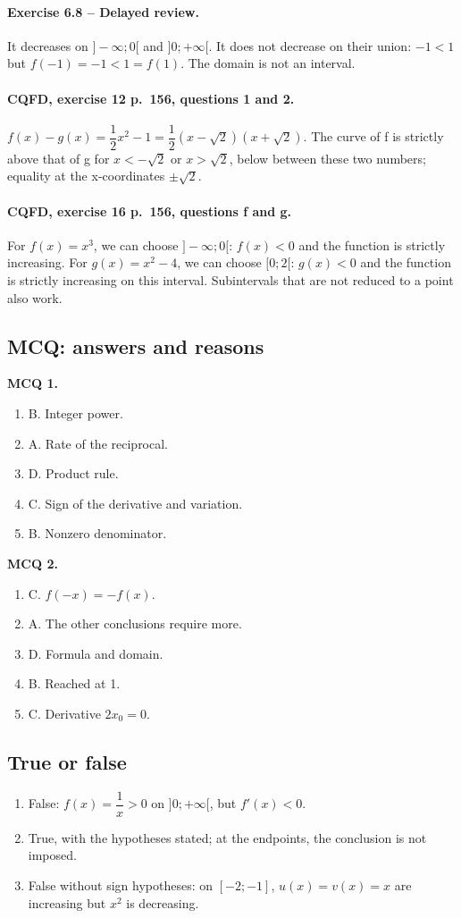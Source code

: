 \paragraph{Exercise 6.8 -- Delayed review.} It decreases on $]-\infty;0[$ and $]0;+\infty[$. It does not decrease on their union: $-1<1$ but $f(-1)=-1<1=f(1)$. The domain is not an interval.
\paragraph{CQFD, exercise 12 p.~156, questions 1 and 2.} $f(x)-g(x)=\dfrac12x^2-1=\dfrac12(x-\sqrt2)(x+\sqrt2)$. The curve of f is strictly above that of g for $x<-\sqrt2$ or $x>\sqrt2$, below between these two numbers; equality at the x-coordinates $\pm\sqrt2$.
\paragraph{CQFD, exercise 16 p.~156, questions f and g.} For $f(x)=x^3$, we can choose $]-\infty;0[$: $f(x)<0$ and the function is strictly increasing. For $g(x)=x^2-4$, we can choose $[0;2[$: $g(x)<0$ and the function is strictly increasing on this interval. Subintervals that are not reduced to a point also work.
\subsection*{MCQ: answers and reasons}
\textbf{MCQ 1.}
\begin{enumerate}
\item B. Integer power.
\item A. Rate of the reciprocal.
\item D. Product rule.
\item C. Sign of the derivative and variation.
\item B. Nonzero denominator.
\end{enumerate}
\textbf{MCQ 2.}
\begin{enumerate}
\item C. $f(-x)=-f(x)$.
\item A. The other conclusions require more.
\item D. Formula and domain.
\item B. Reached at 1.
\item C. Derivative $2x_0=0$.
\end{enumerate}
\subsection*{True or false}
\begin{enumerate}
\item False: $f(x)=\dfrac{1}{x}>0$ on $]0;+\infty[$, but $f\prime(x)<0$.
\item True, with the hypotheses stated; at the endpoints, the conclusion is not imposed.
\item False without sign hypotheses: on $[-2;-1]$, $u(x)=v(x)=x$ are increasing but $x^2$ is decreasing.
\end{enumerate}
